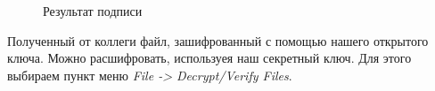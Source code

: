 \documentclass[10pt,a4paper]{report}
\begin{document}
\begin{figure}[h]
	\caption{Результат подписи}
	\label{pic:pic10}
\end{figure}	


Полученный от коллеги файл, зашифрованный с помощью нашего открытого ключа. Можно расшифровать, используея наш секретный ключ. Для этого выбираем пункт меню \textit{File -> Decrypt/Verify Files}.
\end{document}
